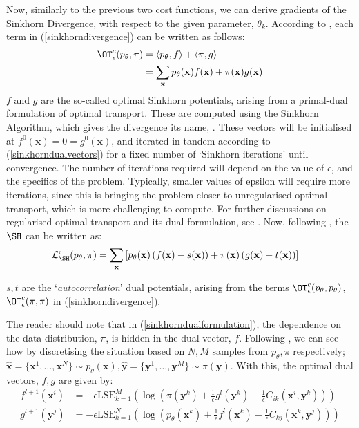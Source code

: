 Now, similarly to the previous two cost functions, we can derive gradients of the Sinkhorn Divergence, with respect to the given parameter, $\theta_k$. According to , each term in (\ref{sinkhorndivergence}) can be written as follows:
\begin{align}
    \OT^c_\epsilon(p_\theta, \pi) &= \langle p_\theta, f \rangle +  \langle \pi, g \rangle \nonumber \\
    & =\sum\limits_\mathbf{x} p_\theta(\mathbf{x})f(\mathbf{x}) + \pi(\mathbf{x})g(\mathbf{x})
\end{align}
$f$ and $g$ are the so-called optimal Sinkhorn potentials, arising from a primal-dual formulation of optimal transport. These are computed using the Sinkhorn Algorithm, which gives the divergence its name, . These vectors will be initialised at $f^0(\mathbf{x}) = 0 = g^0(\mathbf{x})$, and iterated in tandem according to (\ref{sinkhorndualvectors}) for a fixed number of `Sinkhorn iterations' until convergence. The number of iterations required will depend on the value of $\epsilon$, and the specifics of the problem. Typically, smaller values of epsilon will require more iterations, since this is bringing the problem closer to unregularised optimal transport, which is more challenging to compute. For further discussions on regularised optimal transport and its dual formulation, see . Now, following , the $\SH$ can be written as:
\begin{align}
    \mathcal{L}_{\SH}^\epsilon(p_\theta, \pi) = \sum\limits_\mathbf{x}& \left[p_\theta(\mathbf{x})\left(f(\mathbf{x}) - s(\mathbf{x})\right)
    + \pi(\mathbf{x})\left(g(\mathbf{x}) - t(\mathbf{x})\right)\right] \label{sinkhorndualformulation}
\end{align}


$s, t$ are the `\textit{autocorrelation}' dual potentials, arising from the terms $\OT^c_\epsilon(p_\theta, p_\theta)$, $\OT^c_\epsilon(\pi, \pi)$ in (\ref{sinkhorndivergence}).

The reader should note that in (\ref{sinkhorndualformulation}), the dependence on the data distribution, $\pi$, is hidden in the dual vector, $f$. Following , we can see how by discretising the situation based on $N, M$ samples from $p_\theta, \pi$ respectively; $ \hat{\mathbf{x}} = \{\mathbf{x}^1, \dots, \mathbf{x}^N\}\sim p_\theta(\mathbf{x}),  \hat{\mathbf{y}} =\{\mathbf{y}^1, \dots, \mathbf{y}^M\} \sim \pi(\mathbf{y})$. With this, the optimal dual vectors, $f, g$ are given by:
\begin{align}
    f^{l+1}(\mathbf{x}^i) &= -\epsilon \text{LSE}_{k=1}^M\left(\log\left(\pi(\mathbf{\mathbf{y}}^k) + \frac{1}{\epsilon}g^{l}(\mathbf{y}^k) - \frac{1}{\epsilon} C_{ik}(\mathbf{x}^i, \mathbf{y}^k)\right)\right)\\
    g^{l+1}(\mathbf{y}^j) &= -\epsilon \text{LSE}_{k=1}^N\left(\log\left(p_\theta(\mathbf{x}^k) + \frac{1}{\epsilon}f^{l}(\mathbf{x}^k) - \frac{1}{\epsilon} C_{kj}(\mathbf{x}^k, \mathbf{y}^j)\right)\right) \label{sinkhorndualvectors}
\end{align}



